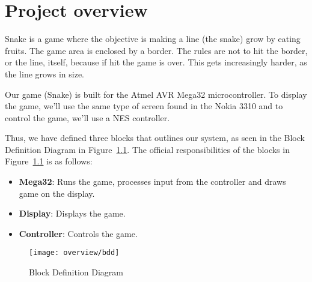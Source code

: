 \chapter{Project overview}

Snake is a game where the objective is making a line (the snake) grow by eating fruits. The game area is enclosed by a border. The rules are not to hit the border, or the line, itself, because if hit the game is over. This gets increasingly harder, as the line grows in size.

Our game (Snake) is built for the Atmel AVR Mega32 microcontroller. To display the game, we'll use the same type of screen found in the Nokia 3310 and to control the game, we'll use a NES controller.

Thus, we have defined three blocks that outlines our system, as seen in the Block Definition Diagram in Figure~\ref{fig:bdd}. The official responsibilities of the blocks in Figure~\ref{fig:bdd} is as follows:

\begin{itemize}
	\item \textbf{Mega32}: Runs the game, processes input from the controller and draws game on the display.
	\item \textbf{Display}: Displays the game.
	\item \textbf{Controller}: Controls the game.
\end{itemize}

\begin{figure}
\centering
\texttt{[image: overview/bdd]}
\caption{Block Definition Diagram}
\label{fig:bdd}
\end{figure}



